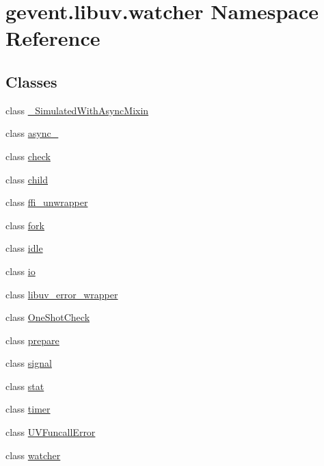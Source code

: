 \hypertarget{namespacegevent_1_1libuv_1_1watcher}{}\section{gevent.\+libuv.\+watcher Namespace Reference}
\label{namespacegevent_1_1libuv_1_1watcher}
\subsection*{Classes}
\begin{DoxyCompactItemize}
\item 
class \hyperlink{classgevent_1_1libuv_1_1watcher_1_1___simulated_with_async_mixin}{\+\_\+\+Simulated\+With\+Async\+Mixin}
\item 
class \hyperlink{classgevent_1_1libuv_1_1watcher_1_1async__}{async\+\_\+}
\item 
class \hyperlink{classgevent_1_1libuv_1_1watcher_1_1check}{check}
\item 
class \hyperlink{classgevent_1_1libuv_1_1watcher_1_1child}{child}
\item 
class \hyperlink{classgevent_1_1libuv_1_1watcher_1_1ffi__unwrapper}{ffi\+\_\+unwrapper}
\item 
class \hyperlink{classgevent_1_1libuv_1_1watcher_1_1fork}{fork}
\item 
class \hyperlink{classgevent_1_1libuv_1_1watcher_1_1idle}{idle}
\item 
class \hyperlink{classgevent_1_1libuv_1_1watcher_1_1io}{io}
\item 
class \hyperlink{classgevent_1_1libuv_1_1watcher_1_1libuv__error__wrapper}{libuv\+\_\+error\+\_\+wrapper}
\item 
class \hyperlink{classgevent_1_1libuv_1_1watcher_1_1_one_shot_check}{One\+Shot\+Check}
\item 
class \hyperlink{classgevent_1_1libuv_1_1watcher_1_1prepare}{prepare}
\item 
class \hyperlink{classgevent_1_1libuv_1_1watcher_1_1signal}{signal}
\item 
class \hyperlink{classgevent_1_1libuv_1_1watcher_1_1stat}{stat}
\item 
class \hyperlink{classgevent_1_1libuv_1_1watcher_1_1timer}{timer}
\item 
class \hyperlink{classgevent_1_1libuv_1_1watcher_1_1_u_v_funcall_error}{U\+V\+Funcall\+Error}
\item 
class \hyperlink{classgevent_1_1libuv_1_1watcher_1_1watcher}{watcher}
\end{DoxyCompactItemize}

